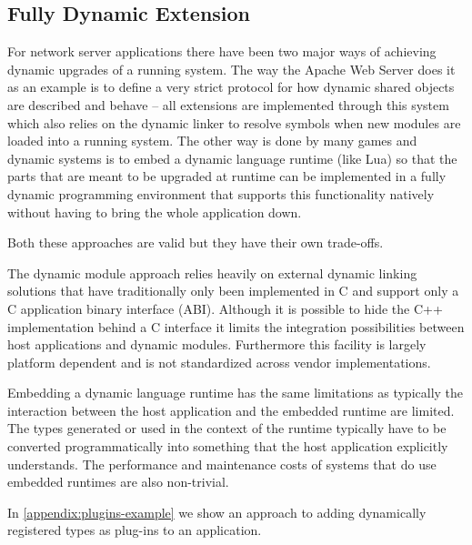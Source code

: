 \subsection{Fully Dynamic Extension}

For network server applications there have been two major ways of achieving
dynamic upgrades of a running system. The way the Apache Web Server does it as
an example is to define a very strict protocol for how dynamic shared objects
are described and behave -- all extensions are implemented through this system
which also relies on the dynamic linker to resolve symbols when new modules are
loaded into a running system. The other way is done by many games and dynamic
systems is to embed a dynamic language runtime (like Lua) so that the parts that
are meant to be upgraded at runtime can be implemented in a fully dynamic
programming environment that supports this functionality natively without having
to bring the whole application down.

Both these approaches are valid but they have their own trade-offs.

The dynamic module approach relies heavily on external dynamic linking solutions
that have traditionally only been implemented in C and support only a C
application binary interface (ABI). Although it is possible to hide the C++
implementation behind a C interface it limits the integration possibilities
between host applications and dynamic modules. Furthermore this facility is
largely platform dependent and is not standardized across vendor
implementations.

Embedding a dynamic language runtime has the same limitations as typically the
interaction between the host application and the embedded runtime are limited.
The types generated or used in the context of the runtime typically have to be
converted programmatically into something that the host application explicitly
understands. The performance and maintenance costs of systems that do use
embedded runtimes are also non-trivial.

In \autoref{appendix:plugins-example} we show an approach to adding dynamically
registered types as plug-ins to an application.
